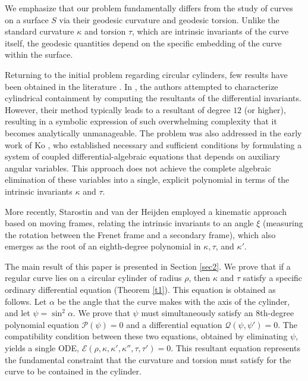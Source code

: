 \documentclass[a4paper,12pt]{amsart}
\theoremstyle{plain}
\theoremstyle{definition}
\begin{document}
We emphasize that our problem fundamentally differs from the study of curves on a surface $S$ via their geodesic curvature and geodesic torsion. Unlike the 
standard curvature $\kappa$ and torsion $\tau$, which are intrinsic invariants of the curve itself, 
the geodesic quantities depend on the 
specific embedding of the curve within the surface. 

Returning to the initial problem regarding circular cylinders, few results have been obtained in the literature \cite{krsw,ko,sh}. 
 In \cite{krsw}, the authors  attempted to characterize cylindrical containment by computing the resultants of the differential invariants. However, their method typically leads to a resultant of degree $12$ (or higher), resulting in a symbolic expression of such overwhelming complexity that it becomes analytically unmanageable.   
 The problem was also addressed in the early work of Ko \cite{ko},  who established necessary and sufficient conditions by formulating a system of coupled differential-algebraic equations that depends on auxiliary angular variables. This approach does not achieve the complete algebraic elimination of these variables into a single, explicit polynomial in terms of the intrinsic invariants $\kappa$ and $\tau$.

More recently, Starostin and van der Heijden \cite{sh} employed a kinematic approach based on moving frames, relating the intrinsic invariants to an angle $\xi$ (measuring the rotation between the Frenet frame and a secondary frame), which also emerges as the root of an eighth-degree polynomial in $\kappa, \tau$, and $\kappa'$.

  
The main result of this paper is presented in Section \ref{sec2}. We prove that if a regular curve lies on a circular cylinder of radius $\rho$, then $\kappa$ and $\tau$ satisfy a specific ordinary differential equation (Theorem \ref{t1}). This equation is obtained as follows. Let $\alpha$ be the angle that the curve makes with the axis of 
the cylinder, and let $\psi = \sin^2 \alpha$. We prove that $\psi$ must simultaneously satisfy an $8$th-degree polynomial equation $\mathcal{P}(\psi) = 0$ and a differential equation $\mathcal{Q}(\psi, \psi') = 0$. 
The compatibility condition between these two equations, obtained by eliminating $\psi$, yields a single  ODE, $\mathcal{E}(\rho, \kappa, \kappa', \kappa'', \tau, \tau') = 0$. This resultant equation represents 
the fundamental constraint that the curvature and torsion must satisfy for the curve to be contained in the cylinder.
\end{document}
